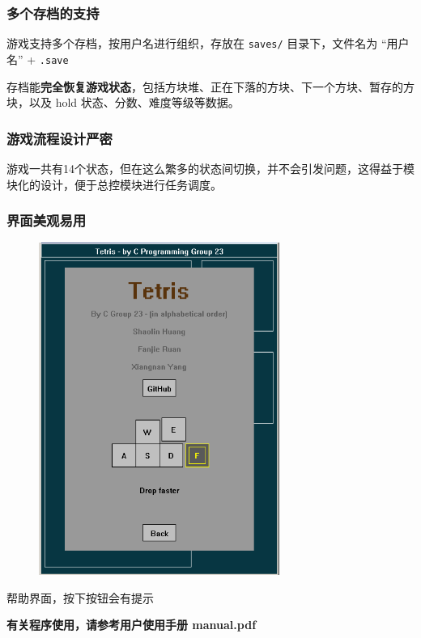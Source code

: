\documentclass{style/ucasproposal}
\newcommand{\cinline}[1]{\texttt{#1}}
\begin{document}
\subsubsection{多个存档的支持}
游戏支持多个存档，按用户名进行组织，存放在 \cinline{saves/} 目录下，文件名为 “用户名” + \cinline{.save}

存档能\textbf{完全恢复游戏状态}，包括方块堆、正在下落的方块、下一个方块、暂存的方块，以及 hold 状态、分数、难度等级等数据。

\subsubsection{游戏流程设计严密}
游戏一共有14个状态，但在这么繁多的状态间切换，并不会引发问题，这得益于模块化的设计，便于总控模块进行任务调度。

\subsubsection{界面美观易用}
\begin{center}
\begin{figure}[H]
\center
    \includegraphics[width=0.7\textwidth]{./img/help.png}
\end{figure}
帮助界面，按下按钮会有提示
\end{center}

\textbf{有关程序使用，请参考用户使用手册 manual.pdf}
\end{document}
